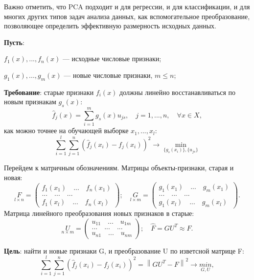 Важно отметить, что PCA подходит и для регрессии, и для классификации, и для многих других типов задач анализа данных, как вспомогательное преобразование, позволяющее определить эффективную размерность исходных данных.

\textbf{Пусть}:

$f_1(x), ..., f_n(x)$ — исходные числовые признаки;

$g_1(x), ..., g_m(x)$ — новые числовые признаки, $m \leq n$;

\textbf{Требование}: старые признаки $f_i(x)$ должны линейно восстанавливаться по новым признакам $g_s(x)$:
\begin{equation}
    \hat{f}_j(x) = \sum_{i=1}^{m}g_s(x)u_{js}, \quad j = 1, ..., n, \quad \forall x \in X, 
\end{equation}
как можно точнее на обучающей выборке $x_1, ..., x_l$:
\begin{equation}
    \sum_{i=1}^{l}\sum_{j=1}^{n}(\hat{f}_j(x_i) - f_j(x_i))^{2} \rightarrow \underset{\{g_s(x_i)\}, \{u_{js}\}}{\min}
\end{equation}

Перейдем к матричным обозначениям. Матрицы объекты-признаки, старая и новая:
\begin{equation}
    \underset{l \times n}{F} = \begin{pmatrix} f_1(x_1) \quad ... \quad f_n(x_1) \\ ... \quad ... \quad ... \\ f_1(x_l) \quad ... \quad f_n(x_l) \end{pmatrix}; \quad \underset{l \times m}{G} = \begin{pmatrix} g_1(x_1) \quad ... \quad g_m(x_1) \\ ... \quad ... \quad ... \\ g_1(x_l) \quad ... \quad g_m(x_l) \end{pmatrix}.
\end{equation}
Матрица линейного преобразования новых признаков в старые:
\begin{equation}
    \underset{n \times m}{U} = \begin{pmatrix} u_{11} \quad ... \quad u_{1m} \\ ... \quad ... \quad ... \\ u_{n1} \quad ... \quad u_{nm} \end{pmatrix}; \quad \hat{F} = GU^{T} \approx F.
\end{equation}

\textbf{Цель}: найти и новые признаки G, и преобразование U по изветсной матрице F:
\begin{equation}
    \sum_{i=1}^{l}\sum_{j=1}^{n}(\hat{f}_j(x_i) - f_j(x_i))^{2} = \left\| GU^{T} - F \right\|^{2} \rightarrow \underset{G, U}{min},
\end{equation}

